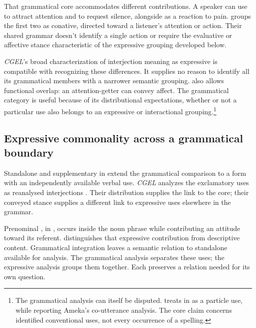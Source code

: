 \documentclass[12pt]{article}
\begin{document}
That grammatical core accommodates different contributions. A speaker can
use  to attract attention and  to request
silence, alongside  as a reaction to pain.
\textcite[113, 115]{ameka1992} groups the first two as conative,
directed toward a listener's attention or action. Their shared grammar
doesn't identify a single action or require the evaluative or affective
stance characteristic of the expressive grouping developed below.

\textit{CGEL}'s broad characterization of interjection meaning as expressive
\citep[1361]{HuddlestonPullum2002} is compatible with recognizing these
differences. It supplies no reason to identify all its grammatical
members with a narrower semantic grouping. \textcite[114]{ameka1992}
also allows functional overlap: an attention-getter can convey affect.
The grammatical category is useful because of its distributional
expectations, whether or not a particular use also belongs to an
expressive or interactional grouping.\footnote{The grammatical analysis can
itself be disputed. \textcite[126--127 n.~5]{wilkins1992} treats  in  as a particle use, while reporting Ameka's
co-utterance analysis. The core claim
concerns identified conventional uses, not every occurrence of a spelling.}

\subsection{Expressive commonality across a grammatical boundary}\label{sec:damn-profiles}

Standalone  and supplementary  in
 extend the grammatical comparison
to a form with an independently available verbal use. \textit{CGEL}
analyzes the exclamatory uses as reanalysed interjections
\citep[1361]{HuddlestonPullum2002}. Their distribution supplies the link
to the core; their conveyed stance supplies a different link to
expressive uses elsewhere in the grammar.

Prenominal , in , occurs inside the
noun phrase while contributing an attitude toward its referent.
\textcite[171, 182]{potts2007} distinguishes that expressive contribution
from descriptive content. Grammatical integration leaves a
semantic relation to standalone  available for analysis.
The grammatical analysis separates these uses; the expressive analysis
groups them together. Each preserves a relation needed for its own
question.
\end{document}
